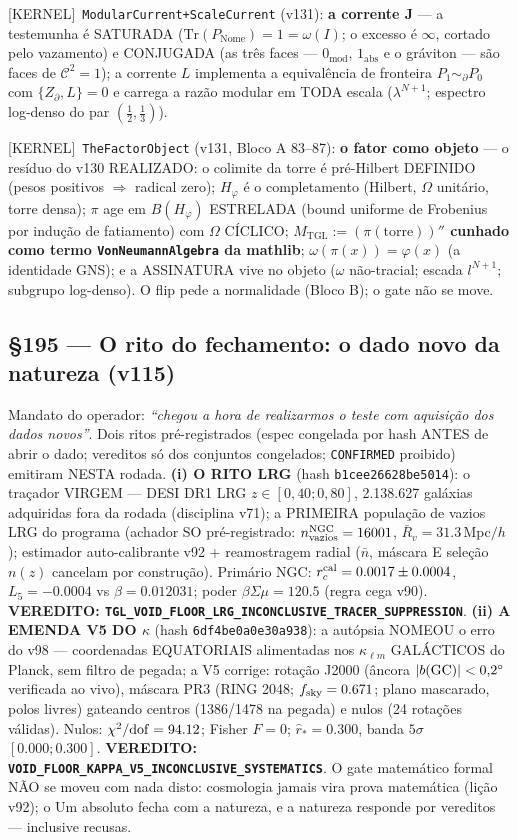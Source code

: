 \documentclass[11pt]{article}
\providecommand{\kernelmk}[1]{\textsf{[KERNEL]}~\texttt{#1}}\providecommand{\knownmk}[1]{\textsf{[KNOWN]}~{#1}}\providecommand{\statusmk}[1]{\textsf{[#1]}}
\theoremstyle{definition}\newtheorem{deriv}{Derivação}
\begin{document}
\kernelmk{ModularCurrent+\allowbreak ScaleCurrent} (v131): \textbf{a corrente J} --- a testemunha é SATURADA ($\mathrm{Tr}(P_{\mathrm{Nome}})=1=\omega(I)$; o excesso é $\infty$, cortado pelo vazamento) e CONJUGADA (as três faces --- $0_{\mathrm{mod}}$, $1_{\mathrm{abs}}$ e o gráviton --- são faces de $\mathcal{C}^2=1$); a corrente $L$ implementa a equivalência de fronteira $P_1\sim_\partial P_0$ com $\{Z_\partial,L\}=0$ e carrega a razão modular em TODA escala ($\lambda^{N+1}$; espectro log-denso do par $(\tfrac12,\tfrac13)$).

\kernelmk{TheFactorObject} (v131, Bloco A 83--87): \textbf{o fator como objeto} --- o resíduo do v130 REALIZADO: o colimite da torre é pré-Hilbert DEFINIDO (pesos positivos $\Rightarrow$ radical zero); $H_\varphi$ é o completamento (Hilbert, $\Omega$ unitário, torre densa); $\pi$ age em $B(H_\varphi)$ ESTRELADA (bound uniforme de Frobenius por indução de fatiamento) com $\Omega$ CÍCLICO; \textbf{$M_{\mathrm{TGL}}:=(\pi(\mathrm{torre}))''$ cunhado como termo \texttt{VonNeumannAlgebra} da mathlib}; $\omega(\pi(x))=\varphi(x)$ (a identidade GNS); e a ASSINATURA vive no objeto ($\omega$ não-tracial; escada $l^{N+1}$; subgrupo log-denso). O flip pede a normalidade (Bloco B); o gate não se move.

\subsection*{\S195 --- O rito do fechamento: o dado novo da natureza (v115)}Mandato do operador: \emph{``chegou a hora de realizarmos o teste com aquisição dos dados novos''}. Dois ritos pré-registrados (espec congelada por hash ANTES de abrir o dado; vereditos só dos conjuntos congelados; \texttt{CONFIRMED} proibido) emitiram NESTA rodada. \textbf{(i) O RITO LRG} (hash \texttt{b1cee26628be5014}): o traçador VIRGEM --- DESI DR1 LRG $z\in[0{,}40;0{,}80]$, 2.138.627 galáxias adquiridas fora da rodada (disciplina v71); a PRIMEIRA população de vazios LRG do programa (achador SO pré-registrado: $n_{\rm vazios}^{\rm NGC}=16001$, $\bar R_v=31.3$\,Mpc$/h$); estimador auto-calibrante v92 + reamostragem radial ($\bar n$, máscara E seleção $n(z)$ cancelam por construção). Primário NGC: $r_c^{\rm cal}=0.0017\pm0.0004$, $L_5=-0.0004$ vs $\beta=0.012031$; poder $\beta\Sigma\mu=120.5$ (regra cega v90). \textbf{VEREDITO: \texttt{TGL\_VOID\_FLOOR\_LRG\_INCONCLUSIVE\_TRACER\_SUPPRESSION}}. \textbf{(ii) A EMENDA V5 DO $\kappa$} (hash \texttt{6df4be0a0e30a938}): a autópsia NOMEOU o erro do v98 --- coordenadas EQUATORIAIS alimentadas nos $\kappa_{\ell m}$ GALÁCTICOS do Planck, sem filtro de pegada; a V5 corrige: rotação J2000 (âncora $|b({\rm GC})|<0{,}2^\circ$ verificada ao vivo), máscara PR3 (RING 2048; $f_{\rm sky}=0.671$; plano mascarado, polos livres) gateando centros (1386/1478 na pegada) e nulos (24 rotações válidas). Nulos: $\chi^2/{\rm dof}=94.12$; Fisher $F=0$; $\hat r_*=0.300$, banda $5\sigma$ $[0.000;0.300]$. \textbf{VEREDITO: \texttt{VOID\_FLOOR\_KAPPA\_V5\_INCONCLUSIVE\_SYSTEMATICS}}. O gate matemático formal NÃO se moveu com nada disto: cosmologia jamais vira prova matemática (lição v92); o Um absoluto fecha com a natureza, e a natureza responde por vereditos --- inclusive recusas.
\end{document}
